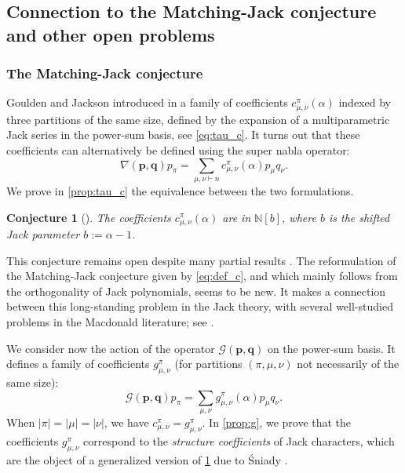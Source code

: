 \documentclass[12pt]{amsart}
\newtheorem{conj}{Conjecture}
\theoremstyle{remark}
\newcommand{\bfp}{\boldsymbol{p}}
\newcommand{\bfq}{\boldsymbol{q}}
\newcommand{\G}{\mathcal G}
\newcommand{\NN}{\mathbb N}
\begin{document}
\subsection{Connection to the Matching-Jack conjecture and other open problems}
\subsubsection{The Matching-Jack conjecture}
Goulden and Jackson introduced in \cite{GouldenJackson1996} a family of coefficients $c^\pi_{\mu,\nu}(\alpha)$ indexed by three partitions of the same size, defined by the expansion of a multiparametric Jack series in the power-sum basis, see \cref{eq:tau_c}. It turns out that these coefficients can alternatively be defined using the super nabla operator:
\begin{equation}\label{eq:def_c}
  \nabla(\bfp,\bfq) p_\pi=\sum_{\mu,\nu\vdash n}c^\pi_{\mu,\nu}(\alpha)p_\mu q_\nu.  
\end{equation}
We prove in \cref{prop:tau_c} the equivalence between the two formulations.  

\begin{conj}[\cite{GouldenJackson1996}]\label{conj:GJ}
    The coefficients $c^\pi_{\mu,\nu}(\alpha)$ are in $\NN[b]$, where $b$ is the shifted Jack parameter $b:=\alpha-1$.
\end{conj}
This conjecture remains open despite many partial results \cite{KanunnikovVassilieva2016,DolegaFeray2016,BenDali2022,BenDali2023}.
The reformulation of the Matching-Jack conjecture given by \cref{eq:def_c}, and which mainly follows from the orthogonality of Jack polynomials, seems to be new. It makes a connection between this long-standing problem in the Jack theory, with several well-studied problems in the Macdonald literature; see \cite{CarlssonMellit2018,DAdderioMellit2022,BlasiakHaimanMorsePunSeelinger2023b,BergeronHaglundIraciRomero2023}.


We consider now the action of the operator $\G(\bfp,\bfq)$ on the power-sum basis. It defines a family of coefficients $g^\pi_{\mu,\nu}$ (for partitions  $(\pi,\mu,\nu)$ not necessarily of the same size):
\begin{equation}\label{eq:def_g}
  \G(\bfp,\bfq) p_\pi=\sum_{\mu,\nu}g^\pi_{\mu,\nu}(\alpha)p_\mu q_\nu.  
\end{equation}
When $|\pi|=|\mu|=|\nu|$, we have $c^{\pi}_{\mu,\nu}=g^{\pi}_{\mu,\nu}$. In \cref{prop:g}, we prove that the coefficients $g^{\pi}_{\mu,\nu}$ correspond to the \emph{structure coefficients} of Jack characters, which are the object of a generalized version of \cref{conj:GJ} due to Śniady \cite[Conjecture 2.2]{Sniady2019}.
\end{document}
